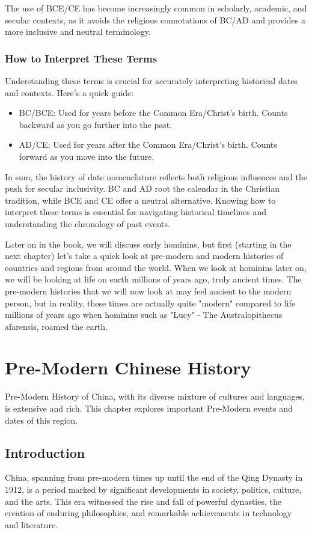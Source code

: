 \documentclass[a4paper,12pt]{book}
\begin{document}
The use of BCE/CE has become increasingly common in scholarly, academic, and secular contexts, as it avoids the religious connotations of BC/AD and provides a more inclusive and neutral terminology.

\subsection*{How to Interpret These Terms}
Understanding these terms is crucial for accurately interpreting historical dates and contexts. Here’s a quick guide:

\begin{itemize}
    \item BC/BCE: Used for years before the Common Era/Christ’s birth. Counts backward as you go further into the past.
    \item AD/CE: Used for years after the Common Era/Christ’s birth. Counts forward as you move into the future.
\end{itemize}

In sum, the history of date nomenclature reflects both religious influences and the push for secular inclusivity. BC and AD root the calendar in the Christian tradition, while BCE and CE offer a neutral alternative. Knowing how to interpret these terms is essential for navigating historical timelines and understanding the chronology of past events.

Later on in the book, we will discuss early hominins, but first (starting in the next chapter) let's take a quick look at pre-modern and modern histories of countries and regions from around the world. When we look at hominins later on, we will be looking at life on earth millions of years ago, truly ancient times. The pre-modern histories that we will now look at may feel ancient to the modern person, but in reality, these times are actually quite "modern" compared to life millions of years ago when hominins such as "Lucy" - The Australopithecus afarensis, roamed the earth. 

\chapter{Pre-Modern Chinese History}
Pre-Modern History of China, with its diverse mixture of cultures and languages, is extensive and rich. This chapter explores important Pre-Modern events and dates of this region.

\section{Introduction}
China, spanning from pre-modern times up until the end of the Qing Dynasty in 1912, is a period marked by significant developments in society, politics, culture, and the arts. This era witnessed the rise and fall of powerful dynasties, the creation of enduring philosophies, and remarkable achievements in technology and literature.
\end{document}
